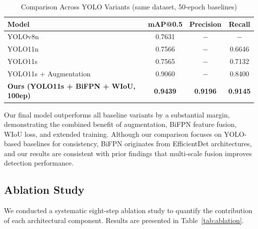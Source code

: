 \documentclass[runningheads]{llncs}
\begin{document}
\begin{table}[H]
\centering
\caption{Comparison Across YOLO Variants (same dataset, 50-epoch baselines)}
\label{tab:comparison}
\begin{tabular}{lccc}
\toprule
\textbf{Model} & \textbf{mAP@0.5} & \textbf{Precision} & \textbf{Recall} \\
\midrule
YOLOv8n~\cite{jocher2023yolov8}  & 0.7631 & $-$ & $-$    \\
YOLO11n                        & 0.7566 & $-$ & 0.6646 \\
YOLO11s                        & 0.7565 & $-$ & 0.7132 \\
YOLO11s + Augmentation         & 0.9060 & $-$ & 0.8400 \\
\midrule
\textbf{Ours (YOLO11s + BiFPN + WIoU, 100ep)} &
\textbf{0.9439} & \textbf{0.9196} & \textbf{0.9145} \\
\bottomrule
\end{tabular}
\end{table}

Our final model outperforms all baseline variants by a substantial
margin, demonstrating the combined benefit of augmentation, BiFPN
feature fusion, WIoU loss, and extended training.
Although our comparison focuses on YOLO-based baselines for consistency,
BiFPN originates from EfficientDet architectures, and our results are
consistent with prior findings that multi-scale fusion improves detection performance.

\subsection{Ablation Study}

We conducted a systematic eight-step ablation study to quantify
the contribution of each architectural component. Results are
presented in Table~\ref{tab:ablation}.
\end{document}
